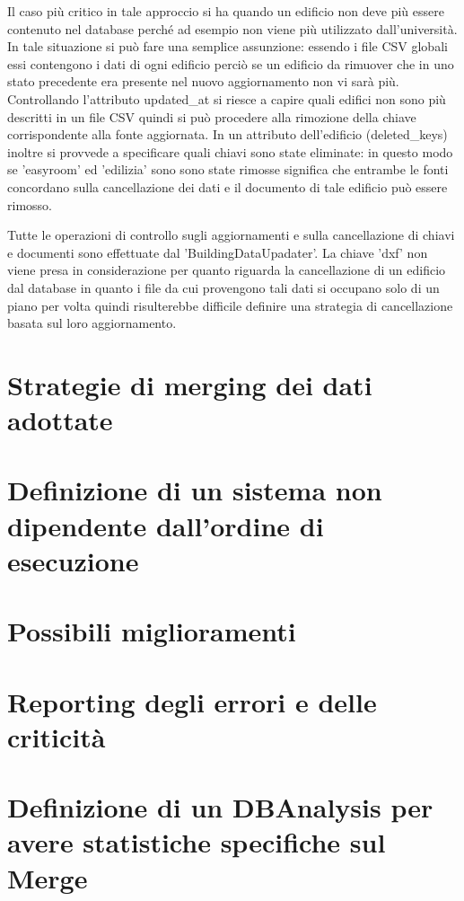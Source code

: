 \documentclass[12pt]{report}
\begin{document}
Il caso più critico in tale approccio si ha quando un edificio non deve più essere contenuto nel database perché ad esempio non viene più utilizzato dall'università.
In tale situazione si può fare una semplice assunzione: essendo i file CSV globali essi contengono i dati di ogni edificio perciò se un edificio da rimuover che in uno stato precedente era presente nel nuovo aggiornamento non vi sarà più.
Controllando l'attributo updated\_at si riesce a capire quali edifici non sono più descritti in un file CSV quindi si può procedere alla rimozione della chiave corrispondente alla fonte aggiornata.
In un attributo dell'edificio (deleted\_keys) inoltre si provvede a specificare quali chiavi sono state eliminate: in questo modo se 'easyroom' ed 'edilizia' sono sono state rimosse significa che entrambe le fonti concordano sulla cancellazione dei dati e il documento di tale edificio può essere rimosso.

Tutte le operazioni di controllo sugli aggiornamenti e sulla cancellazione di chiavi e documenti sono effettuate dal 'BuildingDataUpadater'.
La chiave 'dxf' non viene presa in considerazione per quanto riguarda la cancellazione di un edificio dal database in quanto i file da cui provengono tali dati si occupano solo di un piano per volta quindi risulterebbe difficile definire una strategia di cancellazione basata sul loro aggiornamento.    

\newpage
\section{Strategie di merging dei dati adottate}

\newpage
\section{Definizione di un sistema non dipendente dall'ordine di esecuzione}

\newpage
\section{Possibili miglioramenti}

\newpage
\section{Reporting degli errori e delle criticità}

\newpage
\section{Definizione di un DBAnalysis per avere statistiche specifiche sul Merge}
\end{document}
